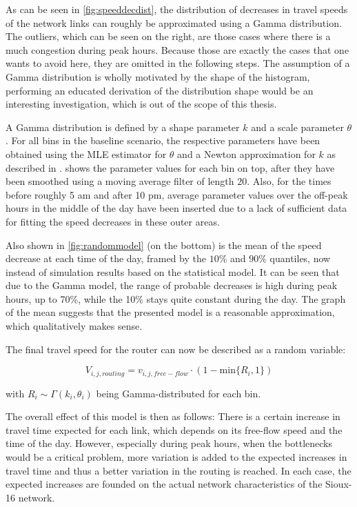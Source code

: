 As can be seen in \cref{fig:speeddecdist}, the distribution of decreases in travel
speeds of the network links can roughly be approximated using a Gamma distribution. The outliers,
which can be seen on the right, are those cases where there is a much congestion during
peak hours. Because those are exactly the cases that one wants to avoid here, they
are omitted in the following steps.
The assumption of a Gamma distribution is wholly motivated by the shape of the histogram,
performing an educated derivation of the distribution shape would be an interesting
investigation, which is out of the scope of this thesis.

A Gamma distribution is defined by a shape parameter $k$ and a scale parameter $\theta$. For
all bins in the baseline scenario, the respective parameters have been obtained using
the MLE estimator for $\theta$ and a Newton approximation for $k$ as described in
\citet{Minka2002}.  shows the parameter values for each bin on top,
after they have been smoothed using a moving average filter of length $20$. Also,
for the times before roughly 5 am and after 10 pm, average parameter values over the
off-peak hours in the middle of the day have been inserted due to a lack of sufficient
data for fitting the speed decreases in these outer areas.

Also shown in \cref{fig:randommodel} (on the bottom) is the mean of the speed decrease at each time of the
day, framed by the $10\%$ and $90\%$ quantiles, now instead of simulation results based on the statistical model.
It can be seen that due to the Gamma model, the range of probable decreases is high during peak hours, up to 70\%,
while the 10\% stays quite constant during the day. The graph of the mean suggests that the presented
model is a reasonable approximation, which qualitatively makes sense.

The final travel speed for the router can now be described as a random variable:

\begin{equation}
    V_{i,j,routing} = v_{i,j,free-flow} \cdot (1 - \text{min}\{ R_i, 1 \})
\end{equation}

with $R_i \sim \Gamma(k_i, \theta_i)$ being Gamma-distributed for each bin.

The overall effect of this model is then as follows: There is a certain increase
in travel time expected for each link, which depends on its free-flow speed and the time
of the day. However, especially during peak hours, when the bottlenecks would be a
critical problem, more variation is added to the expected increases in travel time
and thus a better variation in the routing is reached. In each case, the expected
increases are founded on the actual network characteristics of the Sioux-16 network.


